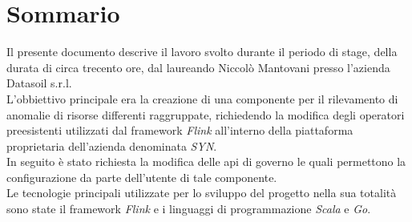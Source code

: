 
\cleardoublepage
{}
{}
\begingroup
\let\clearpage\relax
\let\cleardoublepage\relax
\let\cleardoublepage\relax

\chapter*{Sommario}

Il presente documento descrive il lavoro svolto durante il periodo di stage, della durata di circa trecento ore, dal laureando Niccolò Mantovani presso l'azienda Datasoil s.r.l.\\
L'obbiettivo principale era la creazione di una componente per il rilevamento di anomalie di risorse differenti raggruppate, richiedendo la modifica degli operatori preesistenti utilizzati dal \gls{framework} \textit{Flink} all'interno della piattaforma proprietaria dell'azienda denominata \textit{SYN}.\\
In seguito è stato richiesta la modifica delle \gls{api} di governo le quali permettono la configurazione da parte dell'utente di tale componente.\\
Le tecnologie principali utilizzate per lo sviluppo del progetto nella sua totalità sono state il \gls{framework} \textit{Flink} e i linguaggi di programmazione \textit{Scala} e \textit{Go}.

%
%

\endgroup			

\vfill

